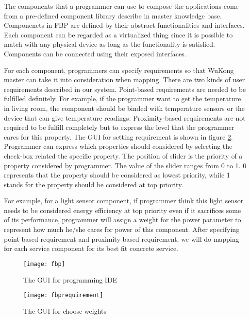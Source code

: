 The components that a programmer can use to compose the applications come from a pre-defined component library describe in master knowledge base. Componenets in FBP are defined by their abstract functionalities and interfaces. Each component can be regarded as a virtualized thing since it is possible to match with any physical device as long as the functionality is satisfied. Components can be connected using their exposed interfaces. 


For each component, programmers can specify requirements so that WuKong master can take it into consideration when mapping. There are two kinds of user requirements described in our system. Point-based requirements are needed to be fulfilled definitely. For example, if the programmer want to get the temperature in living room, the component should be binded with temperature sensors or the device that can give temperature readings. Proximity-based requirements are not required to be fulfill completely but to express the level that the programmer cares for this property. The GUI for setting requirement is shown in figure \ref{requirement}. Programmer can express which properties should considered by selecting the check-box related the specific property. The position of slider is the priority of a property considered by programmer. The value of the slider ranges from 0 to 1. 0 represents that the property should be considered as lowest priority, while 1 stands for the property should be considered at top priority. 

For example, for a light sensor component, if programmer think this light sensor needs to be considered energy efficiency at top priority even if it sacrifices some of its performance, programmer will assign a weight for the power parameter to represent how much he/she cares for power of this component. After specifying point-based requirement and proximity-based requirement, we will do mapping for each service component for its best fit concrete service. 

\begin{figure}[!t]
\centering
\texttt{[image: fbp]}
\caption{The GUI for programming IDE}
\label{fig_sim}
\end{figure}


\begin{figure}[!t]
\centering
\texttt{[image: fbprequirement]}
\caption{The GUI for choose weights}
\label{requirement}
\end{figure}



